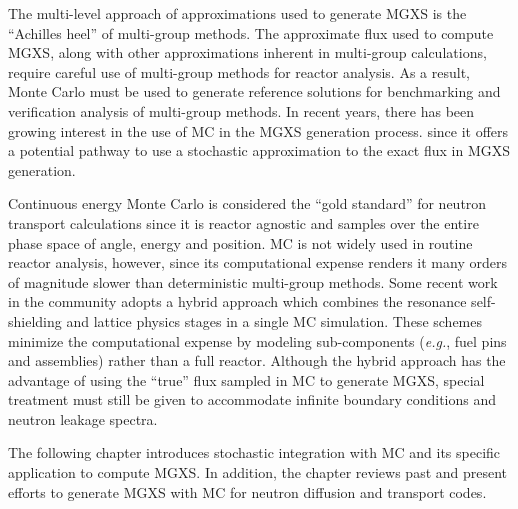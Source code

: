 The multi-level approach of approximations used to generate \ac{MGXS} is the ``Achilles heel'' of multi-group methods. The approximate flux used to compute \ac{MGXS}, along with other approximations inherent in multi-group calculations, require careful use of multi-group methods for reactor analysis. As a result, Monte Carlo must be used to generate reference solutions for benchmarking and verification analysis of multi-group methods. In recent years, there has been growing interest in the use of \ac{MC} in the \ac{MGXS} generation process\cite{leppanen2007serpent,fridman2011serpent,
leppanen2016overview,dorval2015diff,ilas2003monte,pounders2006stochastically,
pounders2009diffusion,pounders2015history,cho2009generation,yun2010monte,
yamamoto2012buckling,yamamoto2012diff,shim2008generation,park2010assembly,park2012generation,
herman2013improved,liuphysor2016,okumura2000validation,tohjoh2005application,
gast1981procedure,ondis2000rcp01,blomquist2002status,redmond1997multigroup,
van2006homogenized,hoogenboom2007generation,yoshioka2010multigroup, yoshioka2011multi,
cai2014condensation,nelson2014improved}. since it offers a potential pathway to use a stochastic approximation to the exact flux in \ac{MGXS} generation.

Continuous energy Monte Carlo is considered the ``gold standard'' for neutron transport calculations since it is reactor agnostic and samples over the entire phase space of angle, energy and position. \ac{MC} is not widely used in routine reactor analysis, however, since its computational expense renders it many orders of magnitude slower than deterministic multi-group methods. Some recent work in the community adopts a hybrid approach which combines the resonance self-shielding and lattice physics stages in a single \ac{MC} simulation. These schemes minimize the computational expense by modeling sub-components (\textit{e.g.}, fuel pins and assemblies) rather than a full reactor. Although the hybrid approach has the advantage of using the ``true'' flux sampled in \ac{MC} to generate \ac{MGXS}, special treatment must still be given to accommodate infinite boundary conditions and neutron leakage spectra.

The following chapter introduces stochastic integration with \ac{MC} and its specific application to compute \ac{MGXS}. In addition, the chapter reviews past and present efforts to generate \ac{MGXS} with \ac{MC} for neutron diffusion and transport codes.


